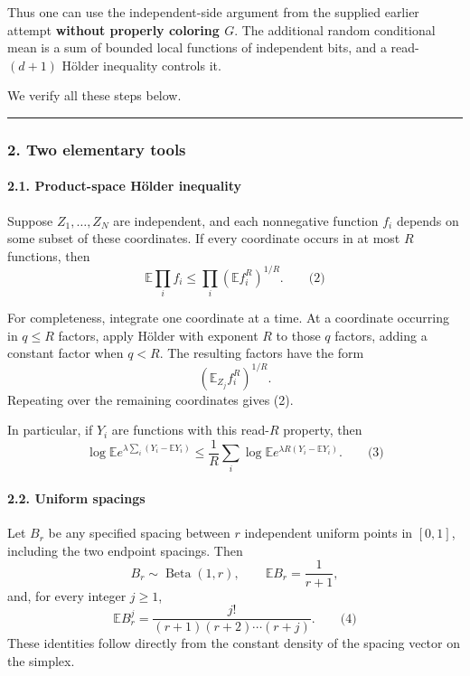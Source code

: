 \documentclass[
  11pt,
  a4paper,
]{article}
\begin{document}
Thus one can use the independent-side argument from the supplied earlier
attempt \textbf{without properly coloring \(G\)}. The additional random
conditional mean is a sum of bounded local functions of independent
bits, and a read-\((d+1)\) Hölder inequality controls it.

We verify all these steps below.

\begin{center}\rule{0.5\linewidth}{0.5pt}\end{center}

\subsubsection{2. Two elementary tools}\label{two-elementary-tools}

\paragraph{2.1. Product-space Hölder
inequality}\label{product-space-huxf6lder-inequality}

Suppose \(Z_1,\ldots,Z_N\) are independent, and each nonnegative
function \(f_i\) depends on some subset of these coordinates. If every
coordinate occurs in at most \(R\) functions, then \[
\mathbb E\prod_i f_i
\le
\prod_i\left(\mathbb E f_i^R\right)^{1/R}.
\qquad\text{(2)}
\]

For completeness, integrate one coordinate at a time. At a coordinate
occurring in \(q\le R\) factors, apply Hölder with exponent \(R\) to
those \(q\) factors, adding a constant factor when \(q<R\). The
resulting factors have the form \[
\left(\mathbb E_{Z_j} f_i^R\right)^{1/R}.
\] Repeating over the remaining coordinates gives (2).

In particular, if \(Y_i\) are functions with this read-\(R\) property,
then \[
\log\mathbb E e^{\lambda\sum_i(Y_i-\mathbb EY_i)}
\le
\frac1R\sum_i
\log\mathbb E e^{\lambda R(Y_i-\mathbb EY_i)}.
\qquad\text{(3)}
\]

\paragraph{2.2. Uniform spacings}\label{uniform-spacings}

Let \(B_r\) be any specified spacing between \(r\) independent uniform
points in \([0,1]\), including the two endpoint spacings. Then \[
B_r\sim\operatorname{Beta}(1,r),
\qquad
\mathbb E B_r=\frac1{r+1},
\] and, for every integer \(j\ge1\), \[
\mathbb E B_r^j
=
\frac{j!}{(r+1)(r+2)\cdots(r+j)}.
\qquad\text{(4)}
\] These identities follow directly from the constant density of the
spacing vector on the simplex.
\end{document}
